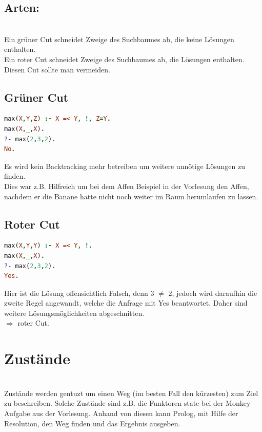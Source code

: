 \subsection{Arten:}\qquad\\
Ein grüner Cut schneidet Zweige des Suchbaumes ab, die keine Lösungen enthalten.\\
Ein roter Cut schneidet Zweige des Suchbaumes ab, die Lösungen enthalten. Diesen Cut sollte man vermeiden.
\subsection{Grüner Cut}
\begin{lstlisting}[language=Prolog] 
max(X,Y,Z) :- X =< Y, !, Z=Y.
max(X,_,X).
?- max(2,3,2).
No.
\end{lstlisting}
Es wird kein Backtracking mehr betreiben um weitere unnötige Lösungen zu finden. \\
Dies war z.B. Hilfreich um bei dem Affen Beispiel in der Vorlesung den Affen, nachdem er die Banane hatte nicht noch weiter im Raum herumlaufen zu lassen. \\
\newpage
\subsection{Roter Cut}
\begin{lstlisting}[language=Prolog] 
max(X,Y,Y) :- X =< Y, !.
max(X,_,X).
?- max(2,3,2).
Yes.
\end{lstlisting}
Hier ist die Lösung offensichtlich Falsch, denn 3 $\neq$ 2, jedoch wird daraufhin die zweite Regel angewandt, welche die Anfrage mit Yes beantwortet. Daher sind weitere Lösungsmöglichkeiten abgeschnitten.\\
$\Rightarrow$ roter Cut. 

\section{Zustände}\qquad\\
Zustände werden gentuzt um einen Weg (im besten Fall den kürzesten) zum Ziel zu beschreiben. Solche Zustände sind z.B. die Funktoren state bei der Monkey Aufgabe aus der Vorlesung. Anhand von diesen kann Prolog, mit Hilfe der Resolution, den Weg finden und das Ergebnis ausgeben. 